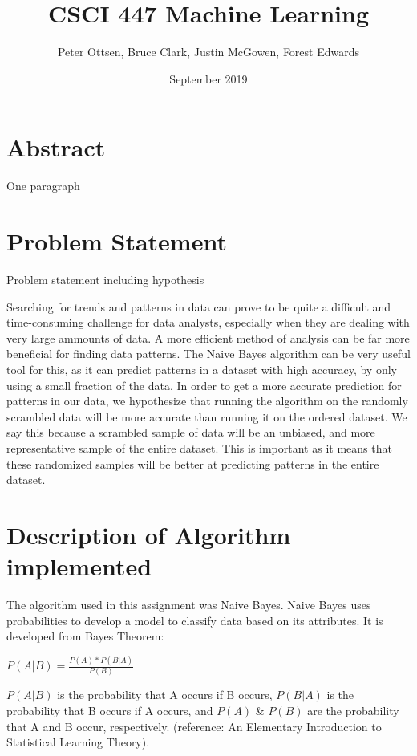 \documentclass{article}
\title{CSCI 447 Machine Learning}
\author{Peter Ottsen, Bruce Clark, Justin McGowen, Forest Edwards}
\date{September 2019}
\begin{document}
\maketitle

\section{Abstract}

One paragraph

\section{Problem Statement}

Problem statement including hypothesis

Searching for trends and patterns in data can prove to be quite a difficult and time-consuming challenge for data analysts, especially when they are dealing with very large ammounts of data.  A more efficient method of analysis can be far more beneficial for finding data patterns.  The Naive Bayes algorithm can be very useful tool for this, as it can predict patterns in a dataset with high accuracy, by only using a small fraction of the data.  
In order to get a more accurate prediction for patterns in our data, we hypothesize that running the algorithm on the randomly scrambled data will be more accurate than running it on the ordered dataset.  We say this because a scrambled sample of data will be an unbiased, and more representative sample of the entire dataset.  This is important as it means that these randomized samples will be better at predicting patterns in the entire dataset.

\section{Description of Algorithm implemented}

The algorithm used in this assignment was Naive Bayes. Naive Bayes uses probabilities to develop a model to classify data based on its attributes. It is developed from Bayes Theorem:
\begin{center}
    $P(A|B) = \frac{P(A)*P(B|A)}{P(B)}$
\end{center}
$P(A|B)$ is the probability that A occurs if B occurs, $P(B|A)$ is the probability that B occurs if A occurs, and $P(A)$ \& $P(B)$ are the probability that A and B occur, respectively. (reference: An Elementary Introduction to Statistical Learning Theory). 
\end{document}
